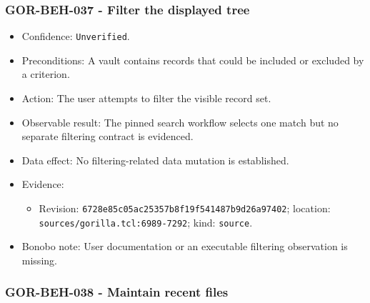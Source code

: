 \documentclass[
  letterpaper,
]{article}
\newcommand{\passthrough}[1]{#1}
\providecommand{\tightlist}{%
  \setlength{\itemsep}{0pt}\setlength{\parskip}{0pt}}
\begin{document}
\subsubsection{GOR-BEH-037 - Filter the displayed tree}\label{gor-beh-037---filter-the-displayed-tree}

\begin{itemize}
\tightlist
\item
  Confidence: \nolinkurl{Unverified}.
\item
  Preconditions: A vault contains records that could be included or excluded by a criterion.
\item
  Action: The user attempts to filter the visible record set.
\item
  Observable result: The pinned search workflow selects one match but no separate filtering contract is evidenced.
\item
  Data effect: No filtering-related data mutation is established.
\item
  Evidence:

  \begin{itemize}
  \tightlist
  \item
    Revision: \nolinkurl{6728e85c05ac25357b8f19f541487b9d26a97402}; location: \nolinkurl{sources/gorilla.tcl:6989-7292};
    kind: \passthrough{\lstinline!source!}.
  \end{itemize}
\item
  Bonobo note: User documentation or an executable filtering observation is missing.
\end{itemize}

\subsubsection{GOR-BEH-038 - Maintain recent files}\label{gor-beh-038---maintain-recent-files}
\end{document}
